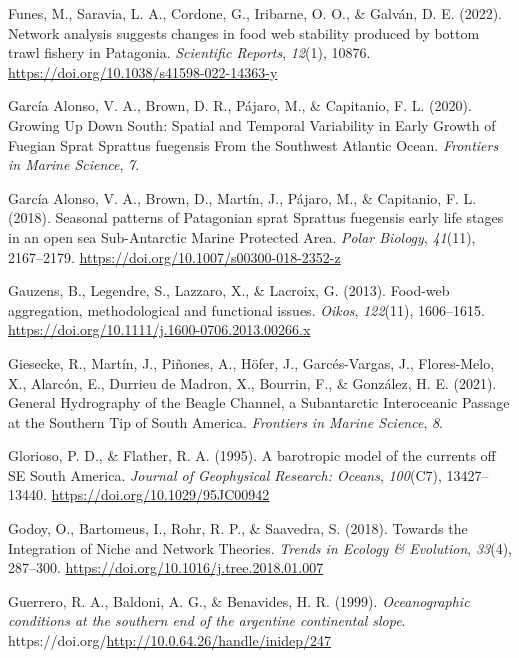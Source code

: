 \documentclass[preprint, 3p,
authoryear]{elsarticle} %
\newlength{\cslhangindent}
\newlength{\cslentryspacingunit} %
\newenvironment{CSLReferences}[2] %
 {%
  \setlength{\parindent}{0pt}
  \ifodd #1
  \let\oldpar\par
  \def\par{\hangindent=\cslhangindent\oldpar}
  \fi
  \setlength{\parskip}{#2\cslentryspacingunit}
 }%
 {}
\begin{document}
\begin{CSLReferences}{1}{0}
\leavevmode{}%
Funes, M., Saravia, L. A., Cordone, G., Iribarne, O. O., \& Galván, D.
E. (2022). Network analysis suggests changes in food web stability
produced by bottom trawl fishery in {Patagonia}. \emph{Scientific
Reports}, \emph{12}(1), 10876.
\url{https://doi.org/10.1038/s41598-022-14363-y}

\leavevmode{}%
García Alonso, V. A., Brown, D. R., Pájaro, M., \& Capitanio, F. L.
(2020). Growing {Up Down South}: {Spatial} and {Temporal Variability} in
{Early Growth} of {Fuegian Sprat Sprattus} fuegensis {From} the
{Southwest Atlantic Ocean}. \emph{Frontiers in Marine Science},
\emph{7}.

\leavevmode{}%
García Alonso, V. A., Brown, D., Martín, J., Pájaro, M., \& Capitanio,
F. L. (2018). Seasonal patterns of {Patagonian} sprat {Sprattus}
fuegensis early life stages in an open sea {Sub-Antarctic Marine
Protected Area}. \emph{Polar Biology}, \emph{41}(11), 2167--2179.
\url{https://doi.org/10.1007/s00300-018-2352-z}

\leavevmode{}%
Gauzens, B., Legendre, S., Lazzaro, X., \& Lacroix, G. (2013). Food-web
aggregation, methodological and functional issues. \emph{Oikos},
\emph{122}(11), 1606--1615.
\url{https://doi.org/10.1111/j.1600-0706.2013.00266.x}

\leavevmode{}%
Giesecke, R., Martín, J., Piñones, A., Höfer, J., Garcés-Vargas, J.,
Flores-Melo, X., Alarcón, E., Durrieu de Madron, X., Bourrin, F., \&
González, H. E. (2021). General {Hydrography} of the {Beagle Channel}, a
{Subantarctic Interoceanic Passage} at the {Southern Tip} of {South
America}. \emph{Frontiers in Marine Science}, \emph{8}.

\leavevmode{}%
Glorioso, P. D., \& Flather, R. A. (1995). A barotropic model of the
currents off {SE South America}. \emph{Journal of Geophysical Research:
Oceans}, \emph{100}(C7), 13427--13440.
\url{https://doi.org/10.1029/95JC00942}

\leavevmode{}%
Godoy, O., Bartomeus, I., Rohr, R. P., \& Saavedra, S. (2018). Towards
the {Integration} of {Niche} and {Network Theories}. \emph{Trends in
Ecology \& Evolution}, \emph{33}(4), 287--300.
\url{https://doi.org/10.1016/j.tree.2018.01.007}

\leavevmode{}%
Guerrero, R. A., Baldoni, A. G., \& Benavides, H. R. (1999).
\emph{Oceanographic conditions at the southern end of the argentine
continental slope}.
https://doi.org/\url{http://10.0.64.26/handle/inidep/247}


\end{CSLReferences}
\end{document}
